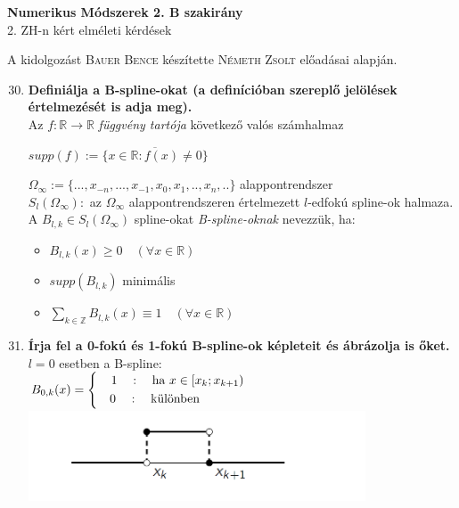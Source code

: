 \documentclass{article}
\begin{document}
\renewcommand{\labelitemi}{\textbullet}
\def\R{\mathbb{R}}
\def\N{\mathbb{N}}
\def\Z{\mathbb{Z}}
\def\C{\mathbb{C}}
\def\rtr{\R\to\R}
\def\ab{[a;b]}
\def\intab{\int\limits_{a}^{b}}
\begin{center}
	{\Large\textbf{Numerikus Módszerek 2. B szakirány}}\\[0.2cm]	
	2. ZH-n kért elméleti kérdések	
\end{center}
{\small A kidolgozást \textsc{Bauer Bence} készítette \textsc{Németh Zsolt} előadásai alapján.}\\
\begin{enumerate}
	\setcounter{enumi}{29}
	\item\textbf{Definiálja a B-spline-okat (a definícióban szereplő jelölések értelmezését is adja meg).}\\[0.1cm]
	Az $f:\rtr$ \textit{függvény tartója} következő valós számhalmaz
	\begin{center}
		$supp(f):=\{\overline{x\in\R:f(x)\neq0}\}$
	\end{center}
	$\Omega_\infty:=\{...,x_{-n},...,x_{-1},x_0,x_1,..,x_n,..\}$ alappontrendszer \\[0.2cm]
	$S_l(\Omega_\infty):$ az $\Omega_\infty$ alappontrendszeren értelmezett $l$-edfokú spline-ok halmaza.\\[0.2cm]
	A $B_{l,k}\in S_l(\Omega_\infty)$ spline-okat \textit{B-spline-oknak} nevezzük, ha:
	\begin{itemize}
		\item $B_{l,k}(x)\geq0\quad(\forall x\in\R)$
		\item $supp(B_{l,k})$ minimális
		\item $\sum\limits_{k\in\Z}B_{l,k}(x)\equiv1\quad(\forall x\in\R)$
	\end{itemize}
	\item\textbf{Írja fel a 0-fokú és 1-fokú B-spline-ok képleteit és ábrázolja is őket.}\\[0.1cm]
	$l=0$ esetben a B-spline:\\[0.2cm]
	$\displaystyle B_{0,k}(x)= 
	\left\{
	\begin{gathered}
	\quad 1\quad:\quad\text{ha }x\in[x_k;x_{k+1})\hspace{5.7cm} \\
	\quad 0\quad:\quad\text{különben}\hspace{7cm}
	\end{gathered}\right.$\\
	\includegraphics[width=10cm]{images/bspline0.png}\\

\end{enumerate}
\end{document}
